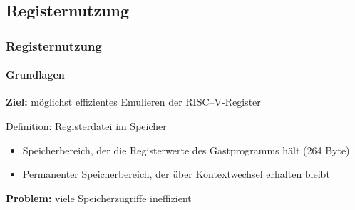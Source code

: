 \subsection{Registernutzung} %
\begin{frame}
	\frametitle{Registernutzung}
	\framesubtitle{Grundlagen}
	
	\textbf{Ziel:} möglichst effizientes Emulieren der RISC--V-Register
	
	\vspace{0.50cm}
	
	\pause
	\begin{block}{Definition: Registerdatei im Speicher}
		\begin{itemize}
			\item Speicherbereich, der die Registerwerte des Gastprogramms hält (264 Byte)
			\item Permanenter Speicherbereich, der über Kontextwechsel erhalten bleibt
		\end{itemize}
	\end{block}
	
	\vspace{0.50cm}
	
	\pause
	\textbf{Problem:} viele Speicherzugriffe \conclude \alert{ineffizient}
\end{frame}

